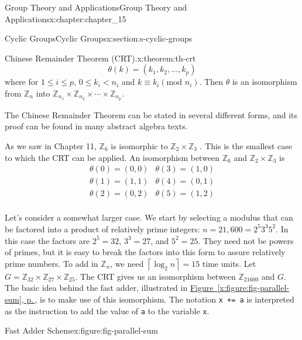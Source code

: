 \documentclass[twoside,10pt,]{book}
\newcommand{\xreffont}{\relax}
\newcommand{\mono}[1]{\texttt{#1}}
\numberwithin{equation}{section}
\begin{document}
\begin{chapterptx}{Group Theory and Applications}{}{Group Theory and Applications}{}{}{x:chapter:chapter_15}
\begin{sectionptx}{Cyclic Groups}{}{Cyclic Groups}{}{}{x:section:s-cyclic-groups}
\begin{theorem}{Chinese Remainder Theorem (CRT).}{}{x:theorem:th-crt}
\begin{equation*}
\theta(k) = \left(k_1, k_2, \ldots , k_p\right)
\end{equation*}
where for \(1\leq i\leq p\),   \(0\leq k_i < n_i\)   and  \(k\equiv k_i\left(\textrm{mod } n_i\right)\).  Then \(\theta\) is an isomorphism from \(\mathbb{Z}_n\) into \(\mathbb{Z}_{n_1}\times \mathbb{Z}_{n_2}\times  \cdots \times \mathbb{Z}_{n_p}\).%
\end{theorem}
The Chinese Remainder Theorem can be stated in several different forms, and its proof can be found in many abstract algebra texts.%
\par
As we saw in Chapter 11, \(\mathbb{Z}_6\) is isomorphic to \(\mathbb{Z}_2 \times  \mathbb{Z}_3\) . This is the smallest case to which the CRT can be applied. An isomorphism between \(\mathbb{Z}_6\) and \(\mathbb{Z}_2 \times  \mathbb{Z}_3\) is%
\begin{equation*}
\begin{array}{cc}
\theta(0) = (0,0) & \theta(3) = (1,0)\\
\theta(1) = (1, 1) & \theta(4) = (0, 1)\\ 
\theta(2) = (0, 2) & \theta(5) = (1,2)\\
\end{array}
\end{equation*}
%
\par
Let's consider a somewhat larger case.  We start by selecting a modulus that can be factored into a product of relatively prime integers: \(n=21,600=2^5 3^3 5^2\).  In this case the factors are \(2^5=32\), \(3^3=27\), and \(5^2=25\).  They need not be powers of primes, but it is easy to break the factors into this form to assure relatively prime numbers.  To add in \(\mathbb{Z}_n\), we need \(\left\lceil \log _2n\right\rceil =15\) time units.  Let \(G=\mathbb{Z}_{32}\times \mathbb{Z}_{27}\times \mathbb{Z}_{25}\).   The CRT gives us an isomorphism between \(\mathbb{Z}_{21600}\) and \(G\). The basic idea behind the fast adder, illustrated in \hyperref[x:figure:fig-parallel-sum]{Figure~{\xreffont\ref{x:figure:fig-parallel-sum}}, p.\,\pageref{x:figure:fig-parallel-sum}}, is to make use of this isomorphism. The notation \mono{x += a} is interpreted as the instruction to add the value of \mono{a} to the variable \mono{x}.%
\begin{figureptx}{Fast Adder Scheme}{x:figure:fig-parallel-sum}{}%
\begin{image}{0.15}{0.7}{0.15}%

\end{image}
\end{figureptx}
\end{sectionptx}
\end{chapterptx}
\end{document}
